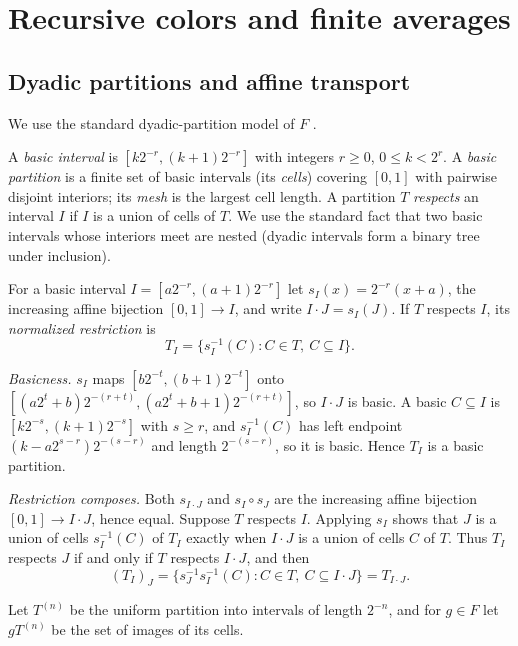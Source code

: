 \documentclass[11pt]{article}
\theoremstyle{definition}
\numberwithin{equation}{section}
\begin{document}
\section{Recursive colors and finite averages}\label{sec:proof}

\subsection{Dyadic partitions and affine transport}\label{sec:dyadic}

We use the standard dyadic-partition model of $F$
\cite[Section~2, Lemma~2.2]{CannonFloydParry1996}.

A \emph{basic interval} is $[k2^{-r},(k+1)2^{-r}]$ with integers
$r\ge0$, $0\le k<2^r$. A \emph{basic partition} is a finite set of basic
intervals (its \emph{cells}) covering $[0,1]$ with pairwise disjoint
interiors; its \emph{mesh} is the largest cell length. A partition $T$
\emph{respects} an interval $I$ if $I$ is a union of cells of $T$. We
use the standard fact that two basic intervals whose interiors meet are
nested (dyadic intervals form a binary tree under inclusion).

For a basic interval $I=[a2^{-r},(a+1)2^{-r}]$ let
$s_I(x)=2^{-r}(x+a)$, the increasing affine bijection $[0,1]\to I$, and
write $I\cdot J=s_I(J)$. If $T$ respects $I$, its \emph{normalized
restriction} is
\[
  T_I=\{s_I^{-1}(C):C\in T,\ C\subseteq I\}.
\]

\emph{Basicness.} $s_I$ maps $[b2^{-t},(b+1)2^{-t}]$ onto
$[(a2^t+b)2^{-(r+t)},(a2^t+b+1)2^{-(r+t)}]$, so $I\cdot J$ is basic. A
basic $C\subseteq I$ is $[k2^{-s},(k+1)2^{-s}]$ with $s\ge r$, and
$s_I^{-1}(C)$ has left endpoint $(k-a2^{s-r})2^{-(s-r)}$ and length
$2^{-(s-r)}$, so it is basic. Hence $T_I$ is a basic partition.

\emph{Restriction composes.} Both $s_{I\cdot J}$ and $s_I\circ s_J$ are
the increasing affine bijection $[0,1]\to I\cdot J$, hence equal.
Suppose $T$ respects $I$. Applying $s_I$ shows that $J$ is a union of
cells $s_I^{-1}(C)$ of $T_I$ exactly when $I\cdot J$ is a union of cells
$C$ of $T$. Thus $T_I$ respects $J$ if and only if $T$ respects
$I\cdot J$, and then
\begin{equation}\label{dyad:restriction}
  (T_I)_J=\{s_J^{-1}s_I^{-1}(C):C\in T,\ C\subseteq I\cdot J\}=T_{I\cdot J}.
\end{equation}

Let $T^{(n)}$ be the uniform partition into intervals of length
$2^{-n}$, and for $g\in F$ let $gT^{(n)}$ be the set of images of its
cells.
\end{document}
